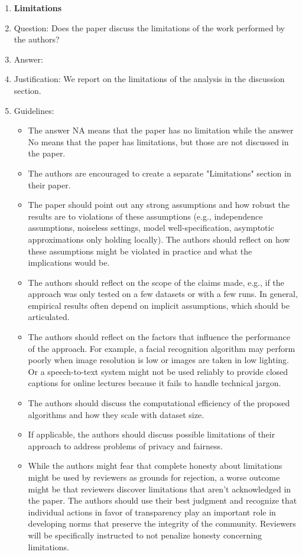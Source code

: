 \documentclass{article} %
\newcounter{ct}
\theoremstyle{definition}
\theoremstyle{remark}
\begin{document}
\begin{enumerate}
\item {\bf Limitations}
    \item[] Question: Does the paper discuss the limitations of the work performed by the authors?
    \item[] Answer: \answerYes{} %
    \item[] Justification: We report on the limitations of the analysis in the discussion section.
    \item[] Guidelines:
    \begin{itemize}
        \item The answer NA means that the paper has no limitation while the answer No means that the paper has limitations, but those are not discussed in the paper. 
        \item The authors are encouraged to create a separate "Limitations" section in their paper.
        \item The paper should point out any strong assumptions and how robust the results are to violations of these assumptions (e.g., independence assumptions, noiseless settings, model well-specification, asymptotic approximations only holding locally). The authors should reflect on how these assumptions might be violated in practice and what the implications would be.
        \item The authors should reflect on the scope of the claims made, e.g., if the approach was only tested on a few datasets or with a few runs. In general, empirical results often depend on implicit assumptions, which should be articulated.
        \item The authors should reflect on the factors that influence the performance of the approach. For example, a facial recognition algorithm may perform poorly when image resolution is low or images are taken in low lighting. Or a speech-to-text system might not be used reliably to provide closed captions for online lectures because it fails to handle technical jargon.
        \item The authors should discuss the computational efficiency of the proposed algorithms and how they scale with dataset size.
        \item If applicable, the authors should discuss possible limitations of their approach to address problems of privacy and fairness.
        \item While the authors might fear that complete honesty about limitations might be used by reviewers as grounds for rejection, a worse outcome might be that reviewers discover limitations that aren't acknowledged in the paper. The authors should use their best judgment and recognize that individual actions in favor of transparency play an important role in developing norms that preserve the integrity of the community. Reviewers will be specifically instructed to not penalize honesty concerning limitations.
    \end{itemize}


\end{enumerate}
\end{document}
